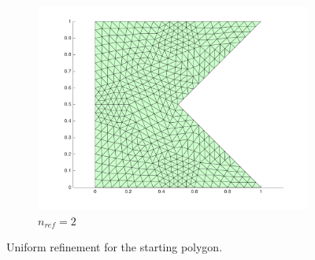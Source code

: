 \documentclass[10pt]{article}
\begin{document}
\begin{figure}[H]
\begin{subfigure}[b]{0.35\textwidth}
                \includegraphics[width=\textwidth]{refine2.png}
                \caption{\(n_{ref}=2\)}
        \end{subfigure}%
        \caption{Uniform refinement for the starting polygon.}
        \label{fig:original}
\end{figure}
\end{document}
